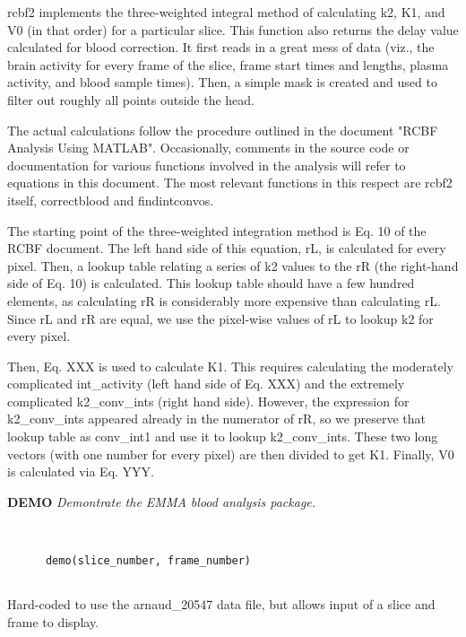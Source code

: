  rcbf2 implements the three-weighted integral method of calculating
  k2, K1, and V0 (in that order) for a particular slice.  This
  function also returns the delay value calculated for blood
  correction.  It first reads in a great mess of data (viz., the brain
  activity for every frame of the slice, frame start times and
  lengths, plasma activity, and blood sample times).  Then, a simple
  mask is created and used to filter out roughly all points outside
  the head.
  
  The actual calculations follow the procedure outlined in the
  document "RCBF Analysis Using MATLAB".  Occasionally, comments in
  the source code or documentation for various functions involved in
  the analysis will refer to equations in this document.  The most
  relevant functions in this respect are rcbf2 itself, correctblood
  and findintconvos.
  
  The starting point of the three-weighted integration method is Eq.
  10 of the RCBF document.  The left hand side of this equation, rL,
  is calculated for every pixel.  Then, a lookup table relating a
  series of k2 values to the rR (the right-hand side of Eq. 10) is
  calculated.  This lookup table should have a few hundred elements,
  as calculating rR is considerably more expensive than calculating
  rL.  Since rL and rR are equal, we use the pixel-wise values of rL
  to lookup k2 for every pixel.
  
  Then, Eq. XXX is used to calculate K1.  This requires calculating
  the moderately complicated int\_activity (left hand side of Eq. XXX)
  and the extremely complicated k2\_conv\_ints (right hand side).
  However, the expression for k2\_conv\_ints appeared already in the
  numerator of rR, so we preserve that lookup table as conv\_int1 and
  use it to lookup k2\_conv\_ints.  These two long vectors (with one
  number for every pixel) are then divided to get K1.  Finally, V0 is
  calculated via Eq. YYY.
\newpage


{\large\bf DEMO} {\em  Demontrate the EMMA blood analysis package.}
\begin{verbatim}


      demo(slice_number, frame_number)


\end{verbatim}

  Hard-coded to use the arnaud\_20547 data
  file, but allows input of a slice and
  frame to display.
\newpage

